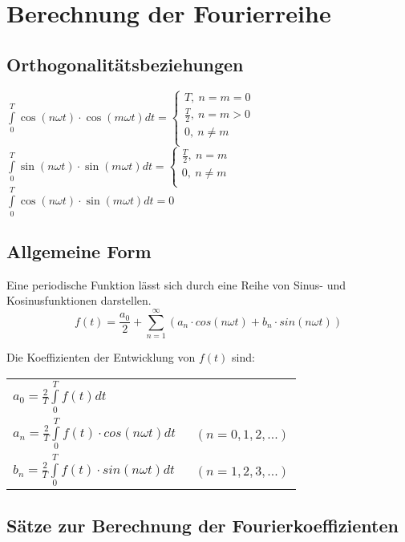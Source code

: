 \section{Berechnung der Fourierreihe}
\subsection{Orthogonalitätsbeziehungen}

            $\int\limits_0^T \cos(n\omega t)\cdot \cos(m\omega t)dt=
            \begin{cases}
            T,\ n=m=0\\
            \frac{T}{2},\ n=m>0\\ 
            0,\ n\neq m\\
            \end{cases}$\\
            
            
           $\int\limits_0^T \sin(n\omega t)\cdot \sin(m\omega t)dt=
           \begin{cases}
           \frac{T}{2},\ n=m\\
           0,\ n\neq m\\
           \end{cases}$\\
           $\int\limits_0^T \cos(n\omega t)\cdot \sin(m\omega t)dt=0$
           
\subsection{Allgemeine Form}
Eine periodische Funktion lässt sich durch eine Reihe von Sinus- und Kosinusfunktionen darstellen.
$$f(t) = \frac{a_{0}}{2}+\sum_{n = 1}^{\infty} (a_{n} \cdot cos(n \omega t)+ b_{n} \cdot sin(n \omega t))$$

Die Koeffizienten der Entwicklung von $f(t)$ sind:\\
\begin{tabular}{ll}
  $a_{0} = \frac{2}{T}\int\limits_{0}^{T}f(t)dt$ & \\
  $a_{n} = \frac{2}{T}\int\limits_{0}^{T}f(t) \cdot cos(n \omega t)dt$   &\ $(n = 0,1,2,...)$\\
  $b_{n} = \frac{2}{T}\int\limits_{0}^{T}f(t) \cdot sin(n \omega t)dt$   &\ $(n = 1,2,3,...)$\\
\end{tabular}
\subsection{Sätze zur Berechnung der Fourierkoeffizienten}
